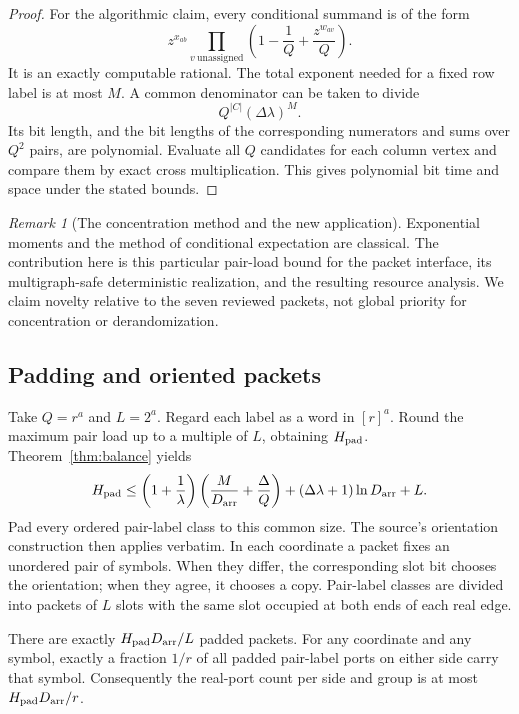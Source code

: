 \documentclass[11pt,letterpaper]{article}
\numberwithin{equation}{section}
\theoremstyle{definition}\newtheorem{definition}[theorem]{Definition}
\theoremstyle{remark}\newtheorem{remark}[theorem]{Remark}
\begin{document}
\begin{proof}
For the algorithmic claim, every conditional summand is of the form
\begin{equation}\label{eq:conditional-product}
 z^{x_{ab}}\prod_{v\ \mathrm{unassigned}}
       \left(1-\frac1Q+\frac{z^{w_{av}}}{Q}\right).
\end{equation}
It is an exactly computable rational. The total exponent needed for a fixed row label is at most $M$. A common denominator can be taken to divide
\[
 Q^{|C|}(\Delta\lambda)^M.
\]
Its bit length, and the bit lengths of the corresponding numerators and sums over $Q^2$ pairs, are polynomial. Evaluate all $Q$ candidates for each column vertex and compare them by exact cross multiplication. This gives polynomial bit time and space under the stated bounds.
\end{proof}

\begin{remark}[The concentration method and the new application]
Exponential moments and the method of conditional expectation are classical. The contribution here is this particular pair-load bound for the packet interface, its multigraph-safe deterministic realization, and the resulting resource analysis. We claim novelty relative to the seven reviewed packets, not global priority for concentration or derandomization.
\end{remark}

\subsection{Padding and oriented packets}

Take $Q=r^a$ and $L=2^a$. Regard each label as a word in $[r]^a$. Round the maximum pair load up to a multiple of $L$, obtaining $H_{\rm pad}$. Theorem~\ref{thm:balance} yields
\begin{equation}\label{eq:padding}
 H_{\rm pad}\le
 \left(1+\frac1\lambda\right)
       \left(\frac{M}{D_{\rm arr}}+\frac\Delta Q\right)
 +(\Delta\lambda+1)\ln D_{\rm arr}+L.
\end{equation}
Pad every ordered pair-label class to this common size. The source's orientation construction then applies verbatim. In each coordinate a packet fixes an unordered pair of symbols. When they differ, the corresponding slot bit chooses the orientation; when they agree, it chooses a copy. Pair-label classes are divided into packets of $L$ slots with the same slot occupied at both ends of each real edge.

There are exactly $H_{\rm pad}D_{\rm arr}/L$ padded packets. For any coordinate and any symbol, exactly a fraction $1/r$ of all padded pair-label ports on either side carry that symbol. Consequently the real-port count per side and group is at most $H_{\rm pad}D_{\rm arr}/r$.
\end{document}

